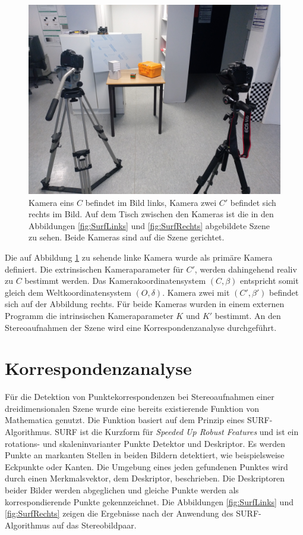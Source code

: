 \begin{figure}[!htb]
	\centering
	\includegraphics[width=.7\linewidth]{images/SetUpSameResolution.jpg}
	\caption[Stereoaufbau im Überblick]{Kamera eins $C$ befindet im Bild links, Kamera zwei $C'$ befindet sich rechts im Bild. Auf dem Tisch zwischen den Kameras ist die in den Abbildungen \ref{fig:SurfLinks} und \ref{fig:SurfRechts} abgebildete Szene zu sehen. Beide Kameras sind auf die Szene gerichtet.}
	\label{fig:StereoaufbauReal}
\end{figure}


Die auf Abbildung \ref{fig:StereoaufbauReal} zu sehende linke Kamera wurde als primäre Kamera definiert. Die extrinsischen Kameraparameter für $C'$, werden dahingehend realiv zu $C$ bestimmt werden. Das Kamerakoordinatensystem $(C,\beta)$ entspricht somit gleich dem Weltkoordinatensystem $(O,\delta)$. Kamera zwei mit $(C',\beta')$ befindet sich auf der Abbildung rechts. Für beide Kameras wurden in einem externen Programm die intrinsischen Kameraparameter $K$ und $K'$ bestimmt. An den Stereoaufnahmen der Szene wird eine Korrespondenzanalyse durchgeführt.   

\section{Korrespondenzanalyse}


Für die Detektion von Punktekorrespondenzen bei Stereoaufnahmen einer dreidimensionalen Szene wurde eine bereits existierende Funktion von Mathematica genutzt\cite{Mathematica}. Die Funktion basiert auf dem Prinzip eines SURF-Algorithmus. SURF ist die Kurzform für \textit{Speeded Up Robust Features} und ist ein rotations- und skaleninvarianter Punkte Detektor und Deskriptor\cite{SURF,SIFTSURF}. Es werden Punkte an markanten Stellen in beiden Bildern detektiert, wie beispielsweise Eckpunkte oder Kanten. Die Umgebung eines jeden gefundenen Punktes wird durch einen Merkmalsvektor, dem Deskriptor, beschrieben. Die Deskriptoren beider Bilder werden abgeglichen und gleiche Punkte werden als korrespondierende Punkte gekennzeichnet\cite{SURF,SIFTSURF}. Die Abbildungen \ref{fig:SurfLinks} und \ref{fig:SurfRechts} zeigen die Ergebnisse nach der Anwendung des SURF-Algorithmus auf das Stereobildpaar.



